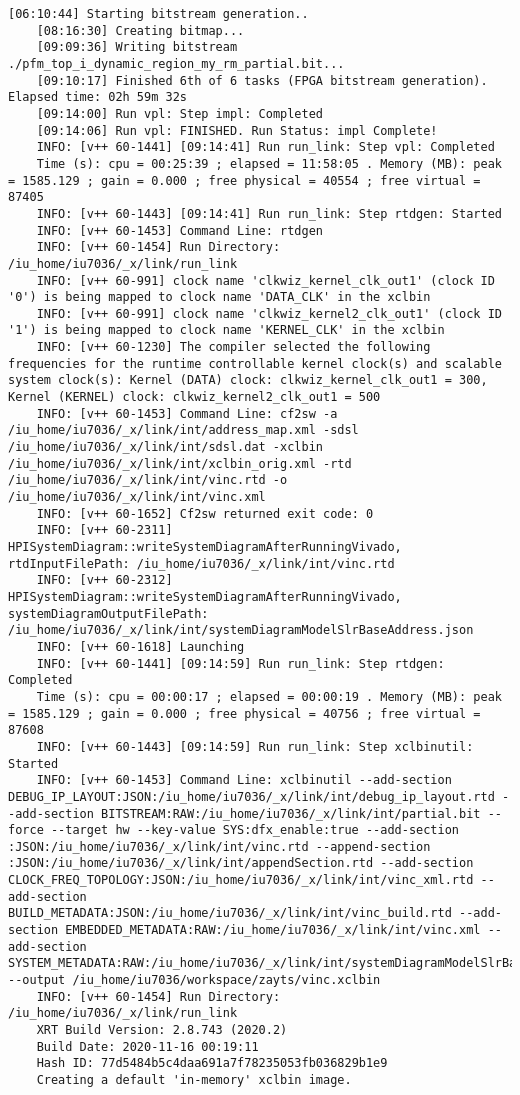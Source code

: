 \begin{lstlisting}[caption=Содержимое файла v++\_vinc.log для измененного проекта, label={log2}]
	[06:10:44] Starting bitstream generation..
	[08:16:30] Creating bitmap...
	[09:09:36] Writing bitstream ./pfm_top_i_dynamic_region_my_rm_partial.bit...
	[09:10:17] Finished 6th of 6 tasks (FPGA bitstream generation). Elapsed time: 02h 59m 32s 
	[09:14:00] Run vpl: Step impl: Completed
	[09:14:06] Run vpl: FINISHED. Run Status: impl Complete!
	INFO: [v++ 60-1441] [09:14:41] Run run_link: Step vpl: Completed
	Time (s): cpu = 00:25:39 ; elapsed = 11:58:05 . Memory (MB): peak = 1585.129 ; gain = 0.000 ; free physical = 40554 ; free virtual = 87405
	INFO: [v++ 60-1443] [09:14:41] Run run_link: Step rtdgen: Started
	INFO: [v++ 60-1453] Command Line: rtdgen
	INFO: [v++ 60-1454] Run Directory: /iu_home/iu7036/_x/link/run_link
	INFO: [v++ 60-991] clock name 'clkwiz_kernel_clk_out1' (clock ID '0') is being mapped to clock name 'DATA_CLK' in the xclbin
	INFO: [v++ 60-991] clock name 'clkwiz_kernel2_clk_out1' (clock ID '1') is being mapped to clock name 'KERNEL_CLK' in the xclbin
	INFO: [v++ 60-1230] The compiler selected the following frequencies for the runtime controllable kernel clock(s) and scalable system clock(s): Kernel (DATA) clock: clkwiz_kernel_clk_out1 = 300, Kernel (KERNEL) clock: clkwiz_kernel2_clk_out1 = 500
	INFO: [v++ 60-1453] Command Line: cf2sw -a /iu_home/iu7036/_x/link/int/address_map.xml -sdsl /iu_home/iu7036/_x/link/int/sdsl.dat -xclbin /iu_home/iu7036/_x/link/int/xclbin_orig.xml -rtd /iu_home/iu7036/_x/link/int/vinc.rtd -o /iu_home/iu7036/_x/link/int/vinc.xml
	INFO: [v++ 60-1652] Cf2sw returned exit code: 0
	INFO: [v++ 60-2311] HPISystemDiagram::writeSystemDiagramAfterRunningVivado, rtdInputFilePath: /iu_home/iu7036/_x/link/int/vinc.rtd
	INFO: [v++ 60-2312] HPISystemDiagram::writeSystemDiagramAfterRunningVivado, systemDiagramOutputFilePath: /iu_home/iu7036/_x/link/int/systemDiagramModelSlrBaseAddress.json
	INFO: [v++ 60-1618] Launching 
	INFO: [v++ 60-1441] [09:14:59] Run run_link: Step rtdgen: Completed
	Time (s): cpu = 00:00:17 ; elapsed = 00:00:19 . Memory (MB): peak = 1585.129 ; gain = 0.000 ; free physical = 40756 ; free virtual = 87608
	INFO: [v++ 60-1443] [09:14:59] Run run_link: Step xclbinutil: Started
	INFO: [v++ 60-1453] Command Line: xclbinutil --add-section DEBUG_IP_LAYOUT:JSON:/iu_home/iu7036/_x/link/int/debug_ip_layout.rtd --add-section BITSTREAM:RAW:/iu_home/iu7036/_x/link/int/partial.bit --force --target hw --key-value SYS:dfx_enable:true --add-section :JSON:/iu_home/iu7036/_x/link/int/vinc.rtd --append-section :JSON:/iu_home/iu7036/_x/link/int/appendSection.rtd --add-section CLOCK_FREQ_TOPOLOGY:JSON:/iu_home/iu7036/_x/link/int/vinc_xml.rtd --add-section BUILD_METADATA:JSON:/iu_home/iu7036/_x/link/int/vinc_build.rtd --add-section EMBEDDED_METADATA:RAW:/iu_home/iu7036/_x/link/int/vinc.xml --add-section SYSTEM_METADATA:RAW:/iu_home/iu7036/_x/link/int/systemDiagramModelSlrBaseAddress.json --output /iu_home/iu7036/workspace/zayts/vinc.xclbin
	INFO: [v++ 60-1454] Run Directory: /iu_home/iu7036/_x/link/run_link
	XRT Build Version: 2.8.743 (2020.2)
	Build Date: 2020-11-16 00:19:11
	Hash ID: 77d5484b5c4daa691a7f78235053fb036829b1e9
	Creating a default 'in-memory' xclbin image.
	

\end{lstlisting}
